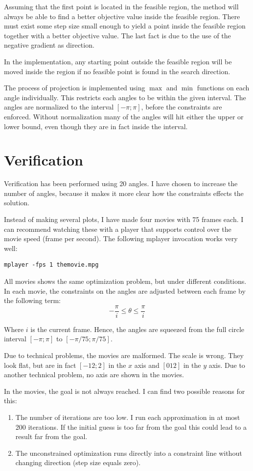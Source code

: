 \documentclass[10pt,oneside,a4paper,final,english]{memoir}
\begin{document}
Assuming that the first point is located in the feasible region, the
method will always be able to find a better objective value inside the
feasible region. There must exist some step size small enough to yield
a point inside the feasible region together with a better objective
value. The last fact is due to the use of the negative gradient as
direction.

In the implementation, any starting point outside the feasible region
will be moved inside the region if no feasible point is found in the
search direction.

The process of projection is implemented using $\max$ and $\min$
functions on each angle individually. This restricts each angles to be
within the given interval. The angles are normalized to the interval
$[-\pi; \pi]$, before the constraints are enforced. Without
normalization many of the angles will hit either the upper or lower
bound, even though they are in fact inside the interval.


\section{Verification}
Verification has been performed using 20 angles. I have chosen to
increase the number of angles, because it makes it more clear how the
constraints effects the solution.

Instead of making several plots, I have made four movies with 75
frames each. I can recommend watching these with a player that
supports control over the movie speed (frame per second). The
following mplayer invocation works very well:
\begin{verbatim}
mplayer -fps 1 themovie.mpg
\end{verbatim}

All movies shows the same optimization problem, but under different
conditions. In each movie, the constraints on the angles are adjusted
between each frame by the following term:
\[ -\frac{\pi}{i} \leq \theta \leq \frac{\pi}{i} \]

Where $i$ is the current frame. Hence, the angles are squeezed from
the full circle interval $[-\pi; \pi]$ to $[-\pi/75; \pi/75]$.

Due to technical problems, the movies are malformed. The scale is
wrong. They look flat, but are in fact $[-12; 2]$ in the $x$ axis and
$[0 12]$ in the $y$ axis. Due to another technical problem, no axis
are shown in the movies.

In the movies, the goal is not always reached. I can find two possible
reasons for this:
\begin{enumerate}
\item The number of iterations are too low. I run each approximation
  in at most 200 iterations. If the initial guess is too far from the
  goal this could lead to a result far from the goal.
\item The unconstrained optimization runs directly into a constraint
  line without changing direction (step size equals zero).
\end{enumerate}
\end{document}
